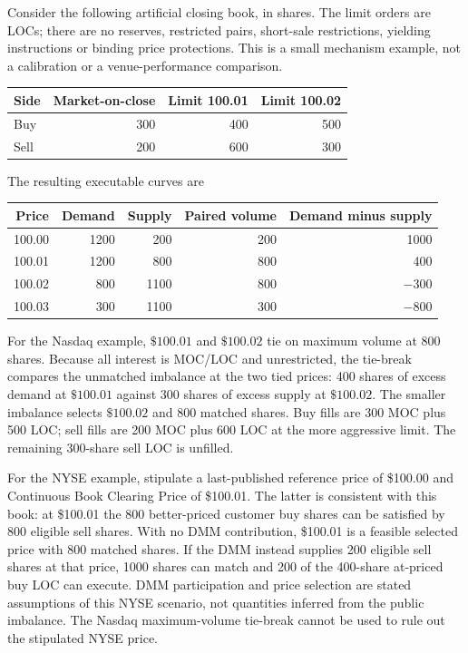 \documentclass[11pt]{article}
\numberwithin{equation}{section}
\theoremstyle{definition}
\theoremstyle{remark}
\theoremstyle{definition}
\begin{document}
Consider the following artificial closing book, in shares. The limit orders
are LOCs; there are no reserves, restricted pairs, short-sale restrictions,
yielding instructions or binding price protections. This is a small mechanism
example, not a calibration or a venue-performance comparison.
\begin{center}\small
\begin{tabular}{lrrr}
\toprule Side & Market-on-close & Limit 100.01 & Limit 100.02 \\\midrule
Buy & 300 & 400 & 500 \\
Sell & 200 & 600 & 300 \\
\bottomrule
\end{tabular}
\end{center}
The resulting executable curves are
\begin{center}\small
\begin{tabular}{rrrrr}
\toprule Price & Demand & Supply & Paired volume & Demand minus supply \\\midrule
100.00 & 1200 & 200 & 200 & 1000 \\
100.01 & 1200 & 800 & 800 & 400 \\
100.02 & 800 & 1100 & 800 & $-300$ \\
100.03 & 300 & 1100 & 300 & $-800$ \\
\bottomrule
\end{tabular}
\end{center}

For the Nasdaq example, $\$100.01$ and $\$100.02$ tie on maximum volume at
800 shares. Because all interest is MOC/LOC and unrestricted, the tie-break
compares the unmatched imbalance at the two tied prices: 400 shares of
excess demand at $\$100.01$ against 300 shares of excess supply at
$\$100.02$. The smaller imbalance selects $\$100.02$ and 800 matched shares.
Buy fills are
300 MOC plus 500 LOC; sell fills are 200 MOC plus 600 LOC at the more aggressive
limit. The remaining 300-share sell LOC is unfilled.

For the NYSE example, stipulate a last-published reference price of \$100.00
and Continuous Book Clearing Price of \$100.01. The latter is consistent with
this book: at \$100.01 the 800 better-priced customer buy shares can be
satisfied by 800 eligible sell shares. With no DMM contribution, \$100.01 is a
feasible selected price with 800 matched shares. If the DMM instead supplies
200 eligible sell shares at that price, 1000 shares can match and 200 of the
400-share at-priced buy LOC can execute. DMM participation and price selection
are stated assumptions of this NYSE scenario, not quantities inferred from the
public imbalance. The Nasdaq maximum-volume tie-break cannot be used to rule
out the stipulated NYSE price.
\end{document}
